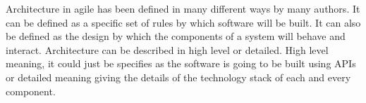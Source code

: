 Architecture in agile has been defined in many different ways by many authors. It can be defined as a specific set of rules 
by which software will be built. It can also be defined as the design by which the components of a system will behave and 
interact. Architecture can be described in high level or detailed. High level meaning, it could just be specifies as the 
software is going to be built using APIs or detailed meaning giving the details of the technology stack of each and every 
component.
